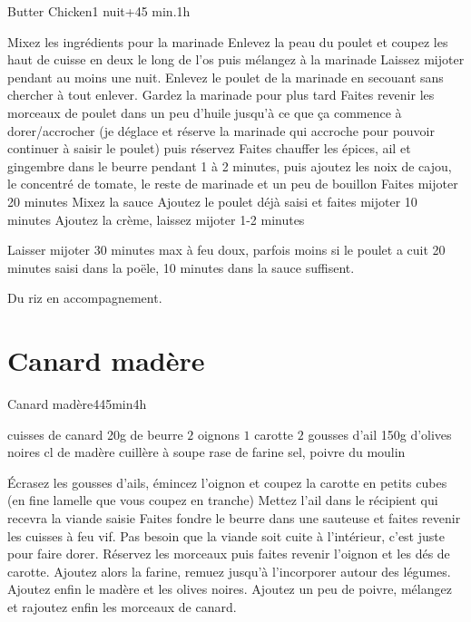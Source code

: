 {\begin{recette}{Butter Chicken}{}{1 nuit+45 min.}{1h}
\begin{preparation}
\etape Mixez les ingrédients pour la marinade
\etape Enlevez la peau du poulet et coupez les haut de cuisse en deux le long de l'os puis mélangez à la marinade
\etape Laissez mijoter pendant au moins une nuit.
\etape Enlevez le poulet de la marinade en secouant sans chercher à tout enlever. Gardez la marinade pour plus tard
\etape Faites revenir les morceaux de poulet dans un peu d'huile jusqu'à ce que ça commence à dorer/accrocher (je déglace et réserve la marinade qui accroche pour pouvoir continuer à saisir le poulet) puis réservez
\etape Faites chauffer les épices, ail et gingembre dans le beurre pendant 1 à 2 minutes, puis ajoutez les noix de cajou, le concentré de tomate, le reste de marinade et un peu de bouillon
\etape Faites mijoter 20 minutes
\etape Mixez la sauce
\etape Ajoutez le poulet déjà saisi et faites mijoter 10 minutes
\etape Ajoutez la crème, laissez mijoter 1-2 minutes
\end{preparation}

\begin{cuisson}
Laisser mijoter 30 minutes max à feu doux, parfois moins si le poulet a cuit 20 minutes saisi dans la poële, 10 minutes dans la sauce suffisent. 

Du riz en accompagnement.
\end{cuisson}
\end{recette}

\section{Canard madère}
\begin{recette}{Canard madère}{4}{45min}{4h}

\begin{ingredients}
 cuisses de canard
\ingredient 20g de beurre
\ingredient $2$ oignons
\ingredient $1$ carotte
\ingredient $2$ gousses d'ail
\ingredient 150g d'olives noires
 cl de madère
 cuillère à soupe rase de farine
\ingredient sel, poivre du moulin
\end{ingredients}

\begin{preparation}
\etape Écrasez les gousses d'ails, émincez l'oignon et coupez la carotte en petits cubes (en fine lamelle que vous coupez en 
tranche)
\etape Mettez l'ail dans le récipient qui recevra la viande saisie
\etape Faites fondre le beurre dans une sauteuse et faites revenir les cuisses à feu vif. Pas besoin que la viande soit cuite à l'intérieur, c'est juste pour faire dorer.
\etape Réservez les morceaux puis faites revenir l'oignon et les dés de carotte.
\etape Ajoutez alors la farine, remuez jusqu'à l'incorporer autour des légumes. Ajoutez enfin le madère et les olives noires. Ajoutez un peu de poivre, mélangez et rajoutez enfin les morceaux de canard.
\end{preparation}


\end{recette}}

